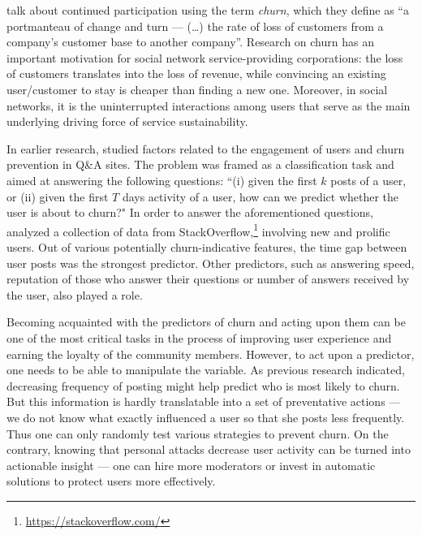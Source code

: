 \documentclass[a4paper,fleqn]{cas-dc}
\begin{document}
\citet{sadeque2019predicting} talk about continued participation using the term \textit{churn}, which they define as ``a portmanteau of change and turn --- (\dots) 
the rate of loss of customers from a company's customer base to another company''. Research on churn has an important motivation for social network service-providing corporations: the loss of customers translates into the loss of revenue, while convincing an existing user/customer to stay is cheaper than finding a new one. Moreover, in social networks, 
it is the uninterrupted 
interactions among users that serve as the main underlying driving force of service sustainability.


In earlier research, \citet{pudipeddi2014user} studied factors related to the engagement of users and churn prevention in Q\&A sites.
The problem was framed as a classification task and aimed at answering the following questions: ``(i) given the first $k$ posts of a user, or (ii) given the first $T$ days activity of a user, how can we predict whether the user is about to churn?" In order to answer the aforementioned questions,
\citet{pudipeddi2014user} analyzed a collection of data from StackOverflow,\footnote{\url{https://stackoverflow.com/}}  involving 
new  and prolific users. 
Out of various potentially churn-indicative features, the time gap between user posts was the strongest predictor.  Other predictors, such as  answering speed, reputation of those who answer their questions or number of answers received by the user, also played a role.

Becoming acquainted with the predictors of churn and acting upon them can be one of the most critical tasks in the process of improving user experience and earning the loyalty of the community members. 
However, to act upon a predictor, one needs to be able to manipulate  the variable. 
As previous research indicated, decreasing frequency of posting might help predict who is most likely to churn. But this information is hardly translatable into a set of preventative actions --- we do not know what exactly influenced a user so that she posts less frequently. Thus one can only randomly test various strategies to prevent churn. On the contrary, knowing that personal attacks decrease user activity can be turned into actionable insight ---  one can hire more moderators or invest in automatic solutions to protect users more effectively.
\end{document}

